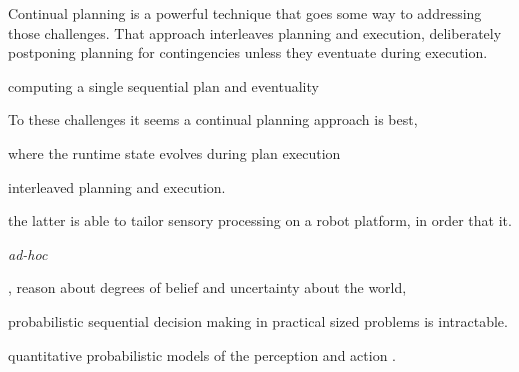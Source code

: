 \documentclass[letterpaper]{article}
\begin{document}
Continual planning is a powerful technique that goes some way to
addressing those challenges. That approach interleaves planning and
execution, deliberately postponing planning for contingencies unless
they eventuate during execution. 


computing a single sequential plan and
eventuality



To these challenges it seems a continual planning approach is best, 

where the runtime state evolves during plan execution 


interleaved planning and execution. 

the latter is able to tailor sensory processing on a robot platform,
in order that it.

{\em ad-hoc} 

, reason about degrees of belief and uncertainty about the world, 

probabilistic sequential decision making in practical sized problems
is intractable.

quantitative probabilistic models of the perception and action .




\end{document}

